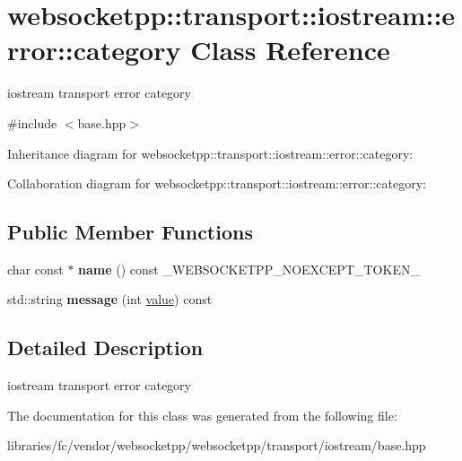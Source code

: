 \hypertarget{classwebsocketpp_1_1transport_1_1iostream_1_1error_1_1category}{}\section{websocketpp\+:\+:transport\+:\+:iostream\+:\+:error\+:\+:category Class Reference}
\label{classwebsocketpp_1_1transport_1_1iostream_1_1error_1_1category}


iostream transport error category  




{\ttfamily \#include $<$base.\+hpp$>$}



Inheritance diagram for websocketpp\+:\+:transport\+:\+:iostream\+:\+:error\+:\+:category\+:


Collaboration diagram for websocketpp\+:\+:transport\+:\+:iostream\+:\+:error\+:\+:category\+:
\subsection*{Public Member Functions}
\begin{DoxyCompactItemize}
\item 
\mbox{\label{classwebsocketpp_1_1transport_1_1iostream_1_1error_1_1category_a64f1fd16853587d751680244b8d105c6}} 
char const  $\ast$ {\bfseries name} () const \+\_\+\+W\+E\+B\+S\+O\+C\+K\+E\+T\+P\+P\+\_\+\+N\+O\+E\+X\+C\+E\+P\+T\+\_\+\+T\+O\+K\+E\+N\+\_\+
\item 
\mbox{\label{classwebsocketpp_1_1transport_1_1iostream_1_1error_1_1category_a8e072eecb96dd743e84b4d1c9e5dbab1}} 
std\+::string {\bfseries message} (int \mbox{\hyperlink{namespacewebsocketpp_1_1transport_1_1iostream_1_1error_a647b428e260748d7606c92255e1e9737}{value}}) const
\end{DoxyCompactItemize}


\subsection{Detailed Description}
iostream transport error category 

The documentation for this class was generated from the following file\+:\begin{DoxyCompactItemize}
\item 
libraries/fc/vendor/websocketpp/websocketpp/transport/iostream/base.\+hpp\end{DoxyCompactItemize}
